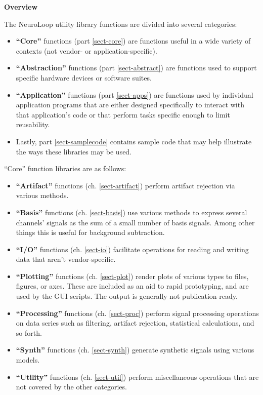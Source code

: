 
\vspace*{0.75in}
{\Huge \bfseries Overview}
\vspace*{\baselineskip}
\label{sect-over}

The NeuroLoop utility library functions are divided into several categories:

\begin{itemize}
%
\item \textbf{``Core''} functions (part \ref{sect-core}) are functions
useful in a wide variety of contexts (not vendor- or application-specific).
%
\item \textbf{``Abstraction''} functions (part \ref{sect-abstract}) are
functions used to support specific hardware devices or software suites.
%
\item \textbf{``Application''} functions (part \ref{sect-apps}) are
functions used by individual application programs that are either designed
specifically to interact with that application's code or that perform
tasks specific enough to limit reusability.
%
\item Lastly, part \ref{sect-samplecode} contains sample code that may
help illustrate the ways these libraries may be used.
%
\end{itemize}

``Core'' function libraries are as follows:

\begin{itemize}
%
\item \textbf{``Artifact''} functions (ch. \ref{sect-artifact}) perform
artifact rejection via various methods.
%
\item \textbf{``Basis''} functions (ch. \ref{sect-basis}) use various
methods to express several channels' signals as the sum of a small number
of basis signals. Among other things this is useful for background
subtraction.
%
\item \textbf{``I/O''} functions (ch. \ref{sect-io}) facilitate operations
for reading and writing data that aren't vendor-specific.
%
\item \textbf{``Plotting''} functions (ch. \ref{sect-plot}) render plots
of various types to files, figures, or axes. These are included as an aid
to rapid prototyping, and are used by the GUI scripts. The output is
generally not publication-ready.
%
\item \textbf{``Processing''} functions (ch. \ref{sect-proc}) perform signal
processing operations on data series such as filtering, artifact rejection,
statistical calculations, and so forth.
%
\item \textbf{``Synth''} functions (ch. \ref{sect-synth}) generate synthetic
signals using various models.
%
\item \textbf{``Utility''} functions (ch. \ref{sect-util}) perform
miscellaneous operations that are not covered by the other categories.
%
\end{itemize}


